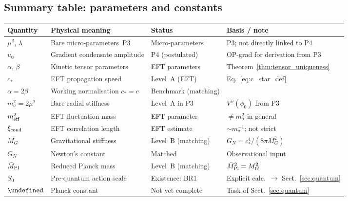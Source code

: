 \documentclass[11pt,a4paper]{article}
\let\hbar\undefined
\numberwithin{equation}{section}
\begin{document}
\subsection{Summary table: parameters and constants}
\label{sec:params_table}

\begin{center}
\renewcommand{\arraystretch}{1.4}
\begin{tabular}{p{2.8cm}p{3cm}p{2.5cm}p{3.2cm}}
\hline\hline
Quantity & Physical meaning & Status & Basis / note \\
\hline
$\mu^2$, $\lambda$
  & Bare micro-parameters~P3
  & Micro-parameters
  & P3; not directly linked to P4 \\
$u_0$
  & Gradient condensate amplitude
  & P4 (postulated)
  & OP-grad for derivation from P3 \\
$\alpha$, $\beta$
  & Kinetic tensor parameters
  & EFT parameters
  & Theorem~\ref{thm:tensor_uniqueness} \\
$c_*$
  & EFT propagation speed
  & Level~A (EFT)
  & Eq.~\eqref{eq:c_star_def} \\
$\alpha=2\beta$
  & Working normalisation $c_*=c$
  & Benchmark (matching)
  & \cite{LIGO_Virgo_GW170817_2017} \\
$m_\sigma^2=2\mu^2$
  & Bare radial stiffness
  & Level~A in P3
  & $V''(\phi_0)$ from P3 \\
$m_{\rm eff}^2$
  & EFT fluctuation mass
  & EFT parameter
  & $\neq m_\sigma^2$ in general \\
$\xi_{\rm cond}$
  & EFT correlation length
  & EFT estimate
  & $\sim m_\sigma^{-1}$; not strict \\
$M_G$
  & Gravitational stiffness
  & Level~B (matching)
  & $G_N=c_*^4/(8\pi M_G^2)$ \\
$G_N$
  & Newton's constant
  & Matched
  & Observational input \\
$\bar{M}_{\rm Pl}$
  & Reduced Planck mass
  & Level~B (matching)
  & $\bar{M}_{\rm Pl}^2=M_G^2$ \\
$S_0$
  & Pre-quantum action scale
  & Existence: BR1
  & Explicit calc.\ $\to$ Sect.~\ref{sec:quantum} \\
$\hbar$
  & Planck constant
  & Not yet complete
  & Task of Sect.~\ref{sec:quantum} \\
\hline\hline
\end{tabular}
\end{center}
\end{document}
